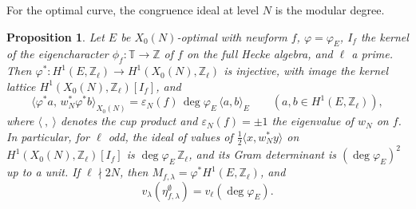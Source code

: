 \documentclass[11pt]{amsart}
\newtheorem{proposition}[theorem]{Proposition}
\theoremstyle{definition}
\newcommand{\Z}{\mathbb{Z}}
\newcommand{\T}{\mathbb{T}}
\newcommand{\degphi}{\deg\varphi_E}
\begin{document}
For the optimal curve, the congruence ideal at level $N$ is the modular degree.

\begin{proposition}\label{prop:pullback}
Let $E$ be $X_0(N)$-optimal with newform $f$, $\varphi=\varphi_E$, $I_f$ the kernel of the eigencharacter $\phi_f\colon\T\to\Z$ of $f$ on the full Hecke algebra, and $\ell$ a prime. Then $\varphi^*\colon H^1(E,\Z_\ell)\to H^1(X_0(N),\Z_\ell)$ is injective, with image the kernel lattice $H^1(X_0(N),\Z_\ell)[I_f]$, and
\[
\langle\varphi^*a,\,w_N^*\varphi^*b\rangle_{X_0(N)}=\varepsilon_N(f)\,\degphi\,\langle a,b\rangle_E\qquad(a,b\in H^1(E,\Z_\ell)),
\]
where $\langle\ ,\ \rangle$ denotes the cup product and $\varepsilon_N(f)=\pm1$ the eigenvalue of $w_N$ on $f$. In particular, for $\ell$ odd, the ideal of values of $\frac12\langle x,w_N^*y\rangle$ on $H^1(X_0(N),\Z_\ell)[I_f]$ is $\degphi\,\Z_\ell$, and its Gram determinant is $(\degphi)^2$ up to a unit. If $\ell\nmid2N$, then $M_{f,\lambda}=\varphi^*H^1(E,\Z_\ell)$, and
\[
v_\lambda(\eta^\emptyset_{f,\lambda})=v_\ell(\degphi).
\]
\end{proposition}
\end{document}
